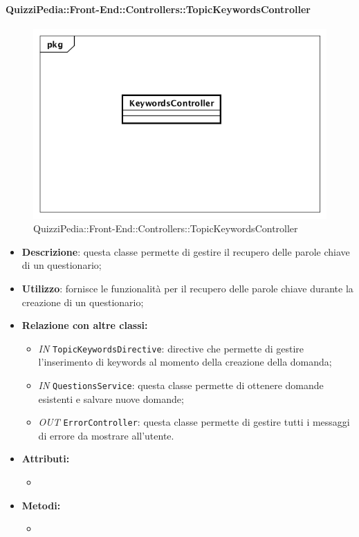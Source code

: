 \paragraph{QuizziPedia::Front-End::Controllers::TopicKeywordsController}
\begin{figure}
	\centering
	\includegraphics[scale=0.45]{UML/Classi/Front-End/QuizziPedia_Front-end_Controller_TopicKeywordsController.png}
	\caption{QuizziPedia::Front-End::Controllers::TopicKeywordsController}
\end{figure}
\begin{itemize}
	\item \textbf{Descrizione}: questa classe permette di gestire il recupero delle parole chiave di un questionario;
	\item \textbf{Utilizzo}: fornisce le funzionalità per il recupero delle parole chiave durante la creazione di un questionario;
	\item \textbf{Relazione con altre classi:}
	\begin{itemize}
		\item \textit{IN} \texttt{TopicKeywordsDirective}: directive che permette di gestire l'inserimento di keywords al momento della creazione della domanda; 
		\item \textit{IN} \texttt{QuestionsService}: questa classe permette di ottenere domande esistenti e salvare nuove domande; 
		\item \textit{OUT} \texttt{ErrorController}: questa classe permette di gestire tutti i messaggi di errore da mostrare all'utente.
	\end{itemize}
	\item \textbf{Attributi:}
	\begin{itemize}
		\item 
	\end{itemize}
	\item \textbf{Metodi:}
	\begin{itemize}
		\item 
	\end{itemize}
\end{itemize}

